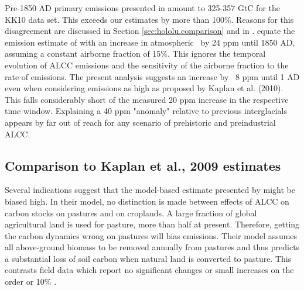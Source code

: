 Pre-1850 AD primary emissions presented in \citet{kaplan09} amount to 325-357 GtC for the KK10 data set. This exceeds our estimates by more than 100\%. Reasons for this disagreement are discussed in Section \ref{sec:hololu.comparison} and in \citet{stocker11bg}. \citet{ruddiman11hol} equate the emission estimate of \citet{kaplan09} with an increase in atmospheric \coo\ by 24 ppm until 1850 AD, assuming a constant airborne fraction of 15\%. This ignores the temporal evolution of ALCC emissions and the sensitivity of the airborne fraction to the rate of emissions. The present analysis suggests an increase by ~8 ppm until 1 AD even when considering emissions as high as proposed by Kaplan et al. (2010). This falls considerably short of the measured 20 ppm increase in the respective time window. Explaining a 40 ppm "anomaly" relative to previous interglacials appears by far out of reach for any scenario of prehistoric and preindustrial ALCC.


\subsection*{Comparison to Kaplan et al.,  2009 estimates}
\label{sec:hololu.comparison}

Several indications suggest that the model-based estimate presented by \citet{kaplan09} might be biased high. In their model, no distinction is made between effects of ALCC on carbon stocks on pastures and on croplands. A large fraction of global agricultural land is used for pasture, more than half at present. Therefore, getting the carbon dynamics wrong on pastures will bias emissions. Their model assumes all above-ground biomass to be removed annually from pastures and thus predicts a substantial loss of soil carbon when natural land is converted to pasture. This contrasts field data which report no significant changes or small increases on the order or 10\% \citep{guogifford02gcb, murty02gcb}.

